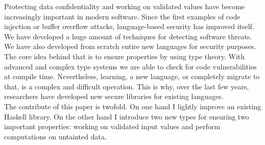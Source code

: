 Protecting data confidentiality and working on validated values have become increasingly important in modern software. Since the first examples of code injection or buffer overflow attacks, language-based security has improved itself. We have developed a huge amount of techniques for detecting software threats. We have also developed from scratch entire new languages for security purposes. \\
The core idea behind that is to ensure properties by using type theory. With advanced and complex type systems we are able to check for code vulnerabilities at compile time. Nevertheless, learning, a new language, or completely migrate to that, is a complex and difficult operation. This is why, over the last few years, researchers have developed new secure libraries for existing languages. \\
The contribute of this paper is twofold. On one hand I lightly improve an existing Haskell library. On the other hand I introduce two new types for ensuring two important properties: working on validated input values and perform computations on untainted data.